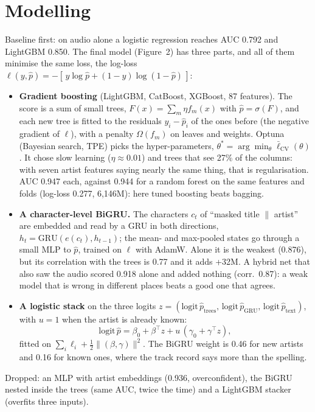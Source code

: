 \documentclass[10pt,a4paper,twocolumn]{extarticle}
\begin{document}
\section{Modelling}
Baseline first: on audio alone a logistic regression reaches AUC 0.792 and LightGBM 0.850. The final model (Figure~2) has
three parts, and all of them minimise the same loss, the log-loss
$\ell(y,\hat p)=-[\,y\log\hat p+(1-y)\log(1-\hat p)\,]$:
\begin{itemize}
  \item \textbf{Gradient boosting} (LightGBM, CatBoost, XGBoost, 87 features). The score is
  a sum of small trees, $F(x)=\sum_{m}\eta f_m(x)$ with $\hat p=\sigma(F)$, and each new
  tree is fitted to the residuals $y_i-\hat p_i$ of the ones before (the negative gradient
  of $\ell$), with a penalty $\Omega(f_m)$ on leaves and weights. Optuna (Bayesian search,
  TPE) picks the hyper-parameters, $\theta^*=\arg\min_\theta \bar\ell_{\text{CV}}(\theta)$.
  It chose slow learning ($\eta\approx0.01$) and trees that see 27\% of the columns: with
  seven artist features saying nearly the same thing, that is regularisation. AUC 0.947
  each, against 0.944 for a random forest on the same features and folds (log-loss 0.277, 6,146M): here tuned boosting beats bagging.
  \item \textbf{A character-level BiGRU.} The characters $c_t$ of ``masked title $\|$ artist''
  are embedded and read by a GRU in both directions, $h_t=\mathrm{GRU}(e(c_t),h_{t-1})$; the
  mean- and max-pooled states go through a small MLP to $\hat p$, trained on $\ell$ with
  AdamW. Alone it is the weakest (0.876), but its correlation with the trees is 0.77 and it
  adds +32M. A hybrid net that also saw the audio scored 0.918 alone and added nothing
  (corr.\ 0.87): a weak model that is wrong in different places beats a good one that
  agrees.
  \item \textbf{A logistic stack} on the three logits
  $z=(\text{logit}\,\hat p_{\text{trees}},\,\text{logit}\,\hat p_{\text{GRU}},\,\text{logit}\,\hat p_{\text{text}})$,
  with $u=1$ when the artist is already known:
  \[
  \text{logit}\,\hat p=\beta_0+\beta^\top z+u\,(\gamma_0+\gamma^\top z),
  \]
  fitted on $\sum_i\ell_i+\tfrac12\|(\beta,\gamma)\|^2$. The BiGRU weight is 0.46 for new
  artists and 0.16 for known ones, where the track record says more than the spelling.
\end{itemize}
Dropped: an MLP with artist embeddings (0.936, overconfident), the BiGRU nested inside the
trees (same AUC, twice the time) and a LightGBM stacker (overfits three inputs).
\end{document}
